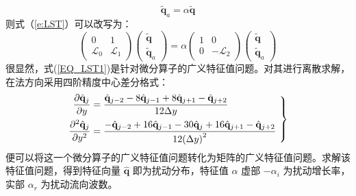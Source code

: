 \begin{equation}\label{}
  \tilde{\mathbf{q}}_a = \alpha\tilde{\mathbf{q}}
\end{equation}
则式（\ref{e:LST}）可以改写为：
\begin{equation}\label{}
  \left(
  \begin{array}{cc}
    0 & 1 \\
    \mathscr{L}_0 & \mathscr{L}_1
  \end{array}
  \right)
  \left(
  \begin{array}{c}
    \tilde{\mathbf{q}} \\
    \tilde{\mathbf{q}}_a
  \end{array}
  \right)
  =\alpha
  \left(
  \begin{array}{cc}
    1 & 0 \\
    0 & -\mathscr{L}_2
  \end{array}
  \right)
  \left( 
  \begin{array}{c}
    \tilde{\mathbf{q}} \\
    \tilde{\mathbf{q}}_a
  \end{array}
  \right)
\end{equation}
很显然，式(\ref{EQ_LST1})是针对微分算子的广义特征值问题。对其进行离散求解，在法方向采用四阶精度中心差分格式：
\begin{equation}\label{EQ_CF}\left.
\begin{aligned}
    \frac{\partial{\hat{\mathbf{q}}_j}}{\partial y} &= \frac{{
    {\hat{\mathbf{q}}_{j - 2}}
    - 8{\hat{\mathbf{q}}_{j - 1}}
    + 8{\hat{\mathbf{q}}_{j + 1}}
    - {\hat{\mathbf{q}}_{j + 2}}}}{{12\Delta y}}\\
    \frac{{{\partial ^2}{\hat{\mathbf{q}}_j}}}{{\partial {y^2}}} &= \frac{{
    - {\hat{\mathbf{q}}_{j - 2}}
    + 16{\hat{\mathbf{q}}_{j - 1}}
    - 30{\hat{\mathbf{q}}_j}
    + 16{\hat{\mathbf{q}}_{j + 1}}
    - {\hat{\mathbf{q}}_{j + 2}}}}{{12{{\left( {\Delta y} \right)}^2}}}
\end{aligned}~\right\}
\end{equation}
便可以将这一个微分算子的广义特征值问题转化为矩阵的广义特征值问题。求解该特征值问题，得到特征向量 $\hat{\mathbf{q}}$ 即为扰动分布，特征值 $\alpha$ 虚部 $-\alpha_i$ 为扰动增长率，实部 $\alpha_r$ 为扰动流向波数。


